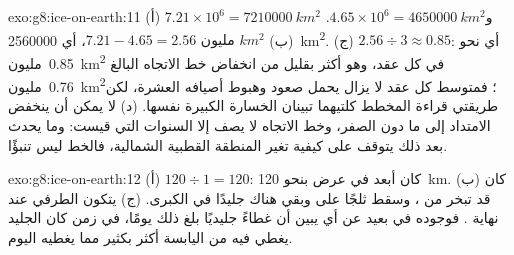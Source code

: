 \begin{solution}{exo:g8:ice-on-earth:11}
(أ) $7.21 \times 10^6 = \qty{7210000}{km^2}$ و$4.65 \times 10^6 =
\qty{4650000}{km^2}$. (ب) $7.21 - 4.65 = \num{2.56}\text{ مليون }\unit{km^2}$، أي
\qty{2560000}{km^2}. (ج) $2.56 \div 3 \approx 0.85$: أي نحو
\num{0.85}~مليون~\unit{km^2} في كل عقد، وهو أكثر بقليل من انخفاض خط الاتجاه
البالغ \num{0.76}~مليون~\unit{km^2}؛ فمتوسط كل عقد لا يزال يحمل صعود وهبوط
أصيافه العشرة، لكن طريقتي قراءة المخطط كلتيهما تبينان الخسارة الكبيرة نفسها.
(د) لا يمكن أن ينخفض الامتداد إلى ما دون الصفر، وخط الاتجاه لا يصف إلا
السنوات التي قيست: وما يحدث بعد ذلك يتوقف على كيفية تغير  المنطقة القطبية
الشمالية، فالخط ليس تنبؤًا.
\end{solution}

\begin{solution}{exo:g8:ice-on-earth:12}
(أ) $120 \div 1 = 120$: كان  أبعد في عرض  بنحو \qty{120}{km}.
(ب) كان قد تبخر من ، وسقط ثلجًا على  وبقي هناك جليدًا في  الكبرى. (ج) يتكون  الطرفي عند نهاية . فوجوده
في  بعيد عن أي  يبين أن غطاءً جليديًا بلغ ذلك  يومًا، في زمن كان
الجليد يغطي فيه من اليابسة أكثر بكثير مما يغطيه اليوم.
\end{solution}

